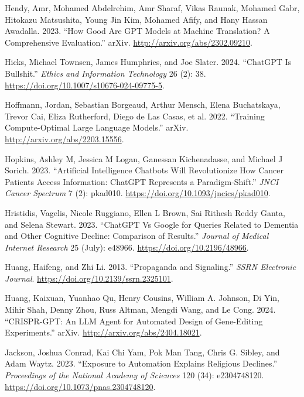 \documentclass[
  Letterpaper,
]{scrbook}
\newlength{\cslhangindent}
\newenvironment{CSLReferences}[2] %
 {\begin{list}{}{%
  \setlength{\itemindent}{0pt}
  \setlength{\leftmargin}{0pt}
  \setlength{\parsep}{0pt}
  \ifodd #1
   \setlength{\leftmargin}{\cslhangindent}
   \setlength{\itemindent}{-1\cslhangindent}
  \fi
  \setlength{\itemsep}{#2\baselineskip}}}
 {\end{list}}
\begin{document}
\begin{CSLReferences}{1}{0}
Hendy, Amr, Mohamed Abdelrehim, Amr Sharaf, Vikas Raunak, Mohamed Gabr,
Hitokazu Matsushita, Young Jin Kim, Mohamed Afify, and Hany Hassan
Awadalla. 2023. {``How {Good} {Are} {GPT} {Models} at {Machine}
{Translation}? {A} {Comprehensive} {Evaluation}.''} arXiv.
\url{http://arxiv.org/abs/2302.09210}.

Hicks, Michael Townsen, James Humphries, and Joe Slater. 2024.
{``{ChatGPT} Is Bullshit.''} \emph{Ethics and Information Technology} 26
(2): 38. \url{https://doi.org/10.1007/s10676-024-09775-5}.

Hoffmann, Jordan, Sebastian Borgeaud, Arthur Mensch, Elena Buchatskaya,
Trevor Cai, Eliza Rutherford, Diego de Las Casas, et al. 2022.
{``Training {Compute}-{Optimal} {Large} {Language} {Models}.''} arXiv.
\url{http://arxiv.org/abs/2203.15556}.

Hopkins, Ashley M, Jessica M Logan, Ganessan Kichenadasse, and Michael J
Sorich. 2023. {``Artificial Intelligence Chatbots Will Revolutionize How
Cancer Patients Access Information: {ChatGPT} Represents a
Paradigm-Shift.''} \emph{JNCI Cancer Spectrum} 7 (2): pkad010.
\url{https://doi.org/10.1093/jncics/pkad010}.

Hristidis, Vagelis, Nicole Ruggiano, Ellen L Brown, Sai Rithesh Reddy
Ganta, and Selena Stewart. 2023. {``{ChatGPT} Vs {Google} for {Queries}
{Related} to {Dementia} and {Other} {Cognitive} {Decline}: {Comparison}
of {Results}.''} \emph{Journal of Medical Internet Research} 25 (July):
e48966. \url{https://doi.org/10.2196/48966}.

Huang, Haifeng, and Zhi Li. 2013. {``Propaganda and {Signaling}.''}
\emph{SSRN Electronic Journal}.
\url{https://doi.org/10.2139/ssrn.2325101}.

Huang, Kaixuan, Yuanhao Qu, Henry Cousins, William A. Johnson, Di Yin,
Mihir Shah, Denny Zhou, Russ Altman, Mengdi Wang, and Le Cong. 2024.
{``{CRISPR}-{GPT}: {An} {LLM} {Agent} for {Automated} {Design} of
{Gene}-{Editing} {Experiments}.''} arXiv.
\url{http://arxiv.org/abs/2404.18021}.

Jackson, Joshua Conrad, Kai Chi Yam, Pok Man Tang, Chris G. Sibley, and
Adam Waytz. 2023. {``Exposure to Automation Explains Religious
Declines.''} \emph{Proceedings of the National Academy of Sciences} 120
(34): e2304748120. \url{https://doi.org/10.1073/pnas.2304748120}.


\end{CSLReferences}
\end{document}
